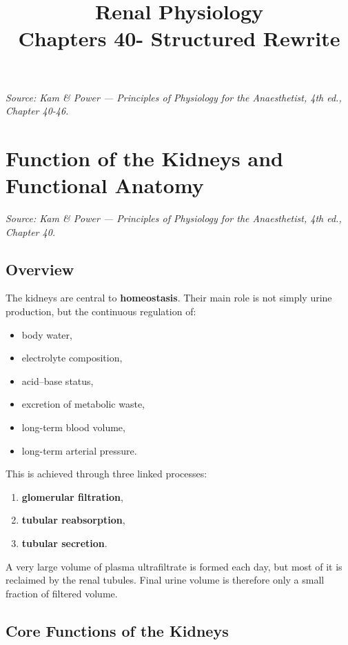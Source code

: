 \documentclass[11pt,a4paper]{article}
\title{Renal Physiology\\Chapters 40- Structured Rewrite}
\author{}
\date{}
\begin{document}
\maketitle

\noindent\textit{Source: Kam \& Power --- \textit{Principles of Physiology for the Anaesthetist}, 4th ed., Chapter 40-46.}

\tableofcontents

\section{Function of the Kidneys and Functional Anatomy}

\noindent\textit{Source: Kam \& Power --- \textit{Principles of Physiology for the Anaesthetist}, 4th ed., Chapter 40.}

\subsection{Overview}

The kidneys are central to \textbf{homeostasis}. Their main role is not simply urine production, but the continuous regulation of:
\begin{itemize}
    \item body water,
    \item electrolyte composition,
    \item acid--base status,
    \item excretion of metabolic waste,
    \item long-term blood volume,
    \item long-term arterial pressure.
\end{itemize}

This is achieved through three linked processes:
\begin{enumerate}
    \item \textbf{glomerular filtration},
    \item \textbf{tubular reabsorption},
    \item \textbf{tubular secretion}.
\end{enumerate}

A very large volume of plasma ultrafiltrate is formed each day, but most of it is reclaimed by the renal tubules. Final urine volume is therefore only a small fraction of filtered volume.

\subsection{Core Functions of the Kidneys}
\end{document}
